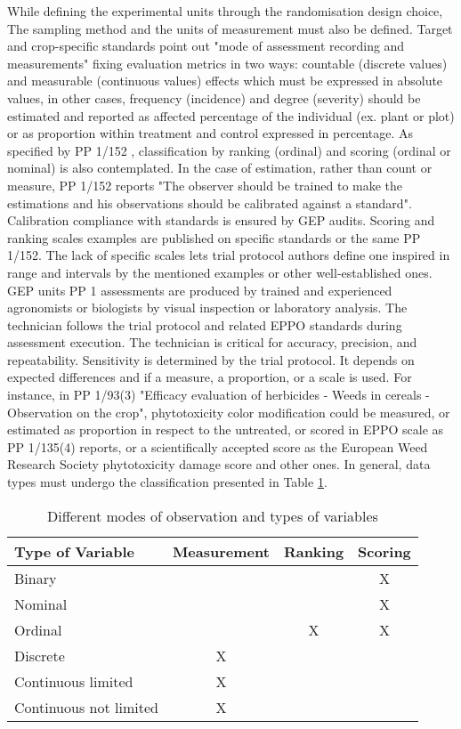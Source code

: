 \documentclass[12pt,a4paper,oneside]{report}
\begin{document}
While defining the experimental units through the randomisation design choice,
The sampling method and the units of measurement must also be defined.
Target and crop-specific standards point out "mode of
assessment recording and measurements" fixing evaluation metrics in two ways:
countable (discrete values) and measurable (continuous values) effects which must be
expressed in absolute values, in other cases, frequency (incidence) and degree
(severity) should be estimated and reported as affected percentage of the individual (ex.
plant or plot) or as proportion within treatment and control expressed in percentage. As
specified by PP 1/152 \cite{EPPO_PP1_152}, classification by ranking (ordinal) and scoring (ordinal or
nominal) is also contemplated. In the case of estimation, rather than count or measure,
PP 1/152 reports "The observer should be trained to make the estimations and his
observations should be calibrated against a standard". Calibration compliance with
standards is ensured by GEP audits. Scoring and ranking scales examples are
published on specific standards or the same PP 1/152. The lack of specific scales lets
trial protocol authors define one inspired in range and intervals by the mentioned
examples or other well-established ones.
GEP units PP 1 assessments are produced by trained and experienced
agronomists or biologists by visual inspection or laboratory analysis. The technician
follows the trial protocol and related EPPO standards during assessment execution. The
technician is critical for accuracy, precision, and repeatability. Sensitivity is determined
by the trial protocol. It depends on expected differences and if a measure, a proportion,
or a scale is used. For instance, in PP 1/93(3) \cite{EPPO_PP1_93} "Efficacy evaluation of herbicides -
Weeds in cereals - Observation on the crop", phytotoxicity color modification could be
measured, or estimated as proportion in respect to the untreated, or scored in EPPO
scale as PP 1/135(4) reports, or a scientifically accepted score as the European Weed
Research Society phytotoxicity damage score \cite{EWRS_score} and other ones.
In general, data types must undergo the classification presented in Table \ref{tab:data_types}.

\begin{table}[ht]
\caption{Different modes of observation and types of variables}
\label{tab:data_types}
\centering
\begin{tabular}{|l|c|c|c|}
\hline
\textbf{Type of Variable} & \textbf{Measurement} & \textbf{Ranking} & \textbf{Scoring} \\
\hline
Binary & & & X \\
\hline
Nominal & & & X \\
\hline
Ordinal & & X & X \\
\hline
Discrete & X & & \\
\hline
Continuous limited & X & & \\
\hline
Continuous not limited & X & & \\
\hline
\end{tabular}
\end{table}
\end{document}
